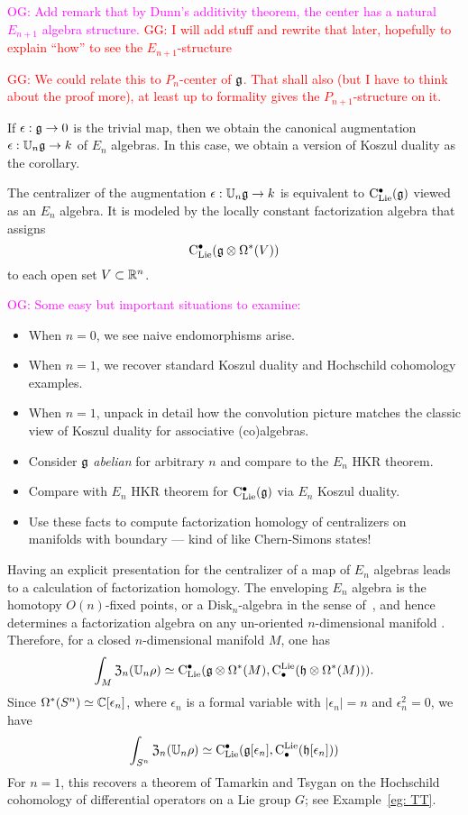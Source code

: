 \documentclass[11pt]{amsart}
\numberwithin{equation}{section}
\def\owen{\textcolor{magenta}{OG: }\textcolor{magenta}}
\def\greg{\textcolor{red}{GG: }\textcolor{red}}
\begin{document}
\owen{Add remark that by Dunn's additivity theorem, the center has a natural $E_{n+1}$ algebra structure.}
\greg{I will add stuff and rewrite that later, hopefully to explain ``how'' to see the $E_{n+1}$-structure}

\greg{We could relate this to $P_n$-center of $\mathfrak g$. That shall also (but I have to think about the proof more), 
at least up to formality gives the $P_{n+1}$-structure on it. }

If $\epsilon: \mathfrak g \to 0$ is the trivial map, then we obtain the canonical augmentation $\epsilon: \mathbb U_n \mathfrak g \to k$ of $E_n$ algebras.
In this case, we obtain a version of Koszul duality as the corollary.

\begin{cor}
\label{thm: koszul duality}
The centralizer of the augmentation $\epsilon: \mathbb U_n \mathfrak g \to k$ is equivalent to ${\rm C}_{\rm Lie}^\bullet(\mathfrak g)$ viewed as an $E_n$ algebra. It is modeled by the locally constant factorization algebra that assigns
\[
{\rm C}_{\rm Lie}^\bullet(\mathfrak g \otimes \Omega^*(V))
\]
to each open set $V \subset \mathbb R^n$.
\end{cor}

\owen{Some easy but important situations to examine:}
\begin{itemize}
\item When $n=0$, we see naive endomorphisms arise.
\item When $n=1$, we recover standard Koszul duality and Hochschild cohomology examples.
\item When $n=1$, unpack in detail how the convolution picture matches the classic view of Koszul duality for associative (co)algebras.
\item Consider $\mathfrak g$ {\em abelian} for arbitrary $n$ and compare to the $E_n$ HKR theorem.
\item Compare with $E_n$ HKR theorem for ${\rm C}_{\rm Lie}^\bullet(\mathfrak g)$ via $E_n$ Koszul duality.
\item Use these facts to compute factorization homology of centralizers on manifolds with boundary --- kind of like Chern-Simons states!
\end{itemize}

Having an explicit presentation for the centralizer of a map of $E_n$ algebras leads to a calculation of factorization homology.
The enveloping $E_n$ algebra is the homotopy $O(n)$-fixed points, or a $\mathrm{Disk}_n$-algebra in the sense of~\cite{AF},
and hence determines a factorization algebra on any un-oriented $n$-dimensional manifold \cite{Knudsen}.
Therefore, for a closed $n$-dimensional manifold $M$, one has
\[
\int_M {\frak Z}_n(\mathbb U_n \rho) \simeq {\rm C}_{\rm Lie}^\bullet(\mathfrak g \otimes \Omega^*(M), {\rm C}^{\rm Lie}_\bullet( \mathfrak h \otimes \Omega^*(M))).
\]
Since $\Omega^*(S^n) \simeq \mathbb C[\epsilon_n]$, where $\epsilon_n$ is a formal variable with $|\epsilon_n| = n$ and $\epsilon_n^2 = 0$, we have
\[
\int_{S^n} {\frak Z}_n(\mathbb U_n \rho) \simeq {\rm C}_{\rm Lie}^\bullet(\mathfrak g[\epsilon_n], {\rm C}^{\rm Lie}_\bullet( \mathfrak h[\epsilon_n]))
\]
For $n=1$, this recovers a theorem of Tamarkin and Tsygan \cite{TT} on the Hochschild cohomology of differential operators on a Lie group $G$;
see Example~\ref{eg: TT}. 
\end{document}
